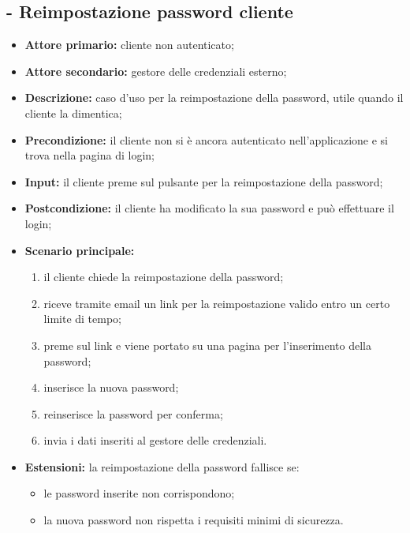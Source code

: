\stepUserCase
\subsection{ - Reimpostazione password cliente}
\begin{itemize}
    \item \textbf{Attore primario:} cliente non autenticato;
    \item \textbf{Attore secondario:} gestore delle credenziali esterno;
    \item \textbf{Descrizione:} caso d'uso per la reimpostazione della password, utile quando il cliente la dimentica;
    \item \textbf{Precondizione:} il cliente non si è ancora autenticato nell'applicazione e si trova nella pagina di login;
    \item \textbf{Input:} il cliente preme sul pulsante per la reimpostazione della password;
    \item \textbf{Postcondizione:} il cliente ha modificato la sua password e può effettuare il login;
    \item \textbf{Scenario principale:}
          \begin{enumerate}
              \item il cliente chiede la reimpostazione della password;
              \item riceve tramite email un link per la reimpostazione valido entro un certo limite di tempo;
              \item preme sul link e viene portato su una pagina per l'inserimento della password;
              \item inserisce la nuova password;
              \item reinserisce la password per conferma;
              \item invia i dati inseriti al gestore delle credenziali.
          \end{enumerate}
    \item \textbf{Estensioni:} la reimpostazione della password fallisce se:
          \begin{itemize}
              \item le password inserite non corrispondono;
              \item la nuova password non rispetta i requisiti minimi di sicurezza.
          \end{itemize}
\end{itemize}

